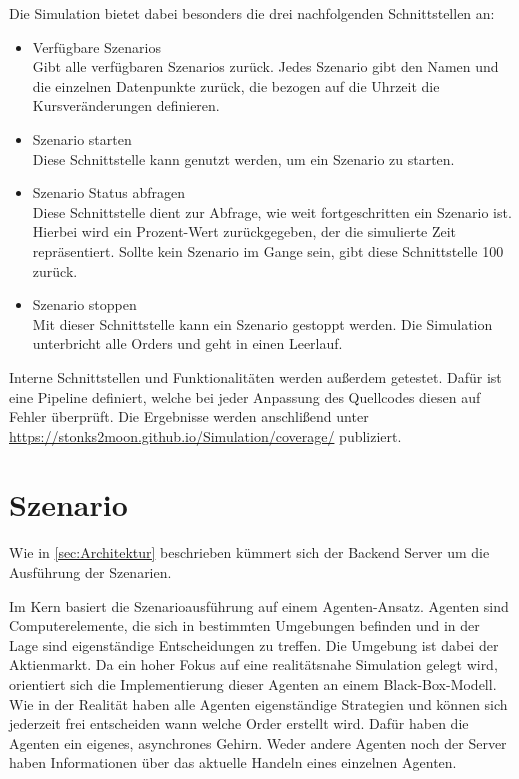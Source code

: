 Die Simulation bietet dabei besonders die drei nachfolgenden Schnittstellen an:
\begin{itemize}
    \item Verfügbare Szenarios\\
        Gibt alle verfügbaren Szenarios zurück. Jedes Szenario gibt den Namen und die einzelnen Datenpunkte zurück, die bezogen auf die Uhrzeit die Kursveränderungen definieren.
    \item Szenario starten\\
        Diese Schnittstelle kann genutzt werden, um ein Szenario zu starten.
    \item Szenario Status abfragen\\
        Diese Schnittstelle dient zur Abfrage, wie weit fortgeschritten ein Szenario ist. Hierbei wird ein Prozent-Wert zurückgegeben, der die simulierte Zeit repräsentiert. Sollte kein Szenario im Gange sein, gibt diese Schnittstelle 100 zurück.
    \item Szenario stoppen\\
        Mit dieser Schnittstelle kann ein Szenario gestoppt werden. Die Simulation unterbricht alle Orders und geht in einen Leerlauf.
\end{itemize}

Interne Schnittstellen und Funktionalitäten werden außerdem getestet.
Dafür ist eine Pipeline definiert, welche bei jeder Anpassung des Quellcodes diesen auf Fehler überprüft.
Die Ergebnisse werden anschlißend unter \href{https://stonks2moon.github.io/Simulation/coverage/}{https://stonks2moon.github.io/Simulation/coverage/} publiziert.

\section{Szenario}
Wie in \autoref{sec:Architektur} beschrieben kümmert sich der Backend Server um die Ausführung der Szenarien.

Im Kern basiert die Szenarioausführung auf einem Agenten-Ansatz. Agenten sind Computerelemente, die sich in bestimmten Umgebungen befinden und in der Lage sind eigenständige Entscheidungen zu treffen. Die Umgebung ist dabei der Aktienmarkt.
Da ein hoher Fokus auf eine realitätsnahe Simulation gelegt wird, orientiert sich die Implementierung dieser Agenten an einem Black-Box-Modell.
Wie in der Realität haben alle Agenten eigenständige Strategien und können sich jederzeit frei entscheiden wann welche Order erstellt wird. Dafür haben die Agenten ein eigenes, asynchrones Gehirn.
Weder andere Agenten noch der Server haben Informationen über das aktuelle Handeln eines einzelnen Agenten.

